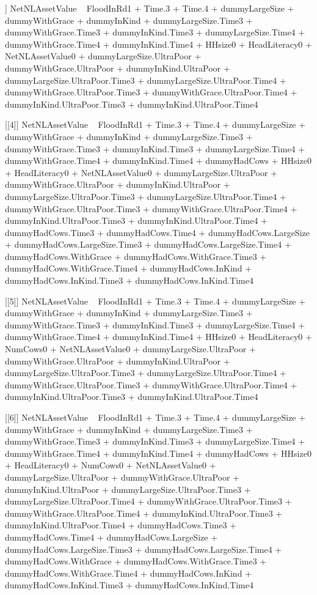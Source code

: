 \begin{Schunk}
\begin{Soutput}
[[3]]
NetNLAssetValue ~ FloodInRd1 + Time.3 + Time.4 + dummyLargeSize + 
    dummyWithGrace + dummyInKind + dummyLargeSize.Time3 + dummyWithGrace.Time3 + 
    dummyInKind.Time3 + dummyLargeSize.Time4 + dummyWithGrace.Time4 + 
    dummyInKind.Time4 + HHsize0 + HeadLiteracy0 + NetNLAssetValue0 + 
    dummyLargeSize.UltraPoor + dummyWithGrace.UltraPoor + dummyInKind.UltraPoor + 
    dummyLargeSize.UltraPoor.Time3 + dummyLargeSize.UltraPoor.Time4 + 
    dummyWithGrace.UltraPoor.Time3 + dummyWithGrace.UltraPoor.Time4 + 
    dummyInKind.UltraPoor.Time3 + dummyInKind.UltraPoor.Time4

[[4]]
NetNLAssetValue ~ FloodInRd1 + Time.3 + Time.4 + dummyLargeSize + 
    dummyWithGrace + dummyInKind + dummyLargeSize.Time3 + dummyWithGrace.Time3 + 
    dummyInKind.Time3 + dummyLargeSize.Time4 + dummyWithGrace.Time4 + 
    dummyInKind.Time4 + dummyHadCows + HHsize0 + HeadLiteracy0 + 
    NetNLAssetValue0 + dummyLargeSize.UltraPoor + dummyWithGrace.UltraPoor + 
    dummyInKind.UltraPoor + dummyLargeSize.UltraPoor.Time3 + 
    dummyLargeSize.UltraPoor.Time4 + dummyWithGrace.UltraPoor.Time3 + 
    dummyWithGrace.UltraPoor.Time4 + dummyInKind.UltraPoor.Time3 + 
    dummyInKind.UltraPoor.Time4 + dummyHadCows.Time3 + dummyHadCows.Time4 + 
    dummyHadCows.LargeSize + dummyHadCows.LargeSize.Time3 + dummyHadCows.LargeSize.Time4 + 
    dummyHadCows.WithGrace + dummyHadCows.WithGrace.Time3 + dummyHadCows.WithGrace.Time4 + 
    dummyHadCows.InKind + dummyHadCows.InKind.Time3 + dummyHadCows.InKind.Time4

[[5]]
NetNLAssetValue ~ FloodInRd1 + Time.3 + Time.4 + dummyLargeSize + 
    dummyWithGrace + dummyInKind + dummyLargeSize.Time3 + dummyWithGrace.Time3 + 
    dummyInKind.Time3 + dummyLargeSize.Time4 + dummyWithGrace.Time4 + 
    dummyInKind.Time4 + HHsize0 + HeadLiteracy0 + NumCows0 + 
    NetNLAssetValue0 + dummyLargeSize.UltraPoor + dummyWithGrace.UltraPoor + 
    dummyInKind.UltraPoor + dummyLargeSize.UltraPoor.Time3 + 
    dummyLargeSize.UltraPoor.Time4 + dummyWithGrace.UltraPoor.Time3 + 
    dummyWithGrace.UltraPoor.Time4 + dummyInKind.UltraPoor.Time3 + 
    dummyInKind.UltraPoor.Time4

[[6]]
NetNLAssetValue ~ FloodInRd1 + Time.3 + Time.4 + dummyLargeSize + 
    dummyWithGrace + dummyInKind + dummyLargeSize.Time3 + dummyWithGrace.Time3 + 
    dummyInKind.Time3 + dummyLargeSize.Time4 + dummyWithGrace.Time4 + 
    dummyInKind.Time4 + dummyHadCows + HHsize0 + HeadLiteracy0 + 
    NumCows0 + NetNLAssetValue0 + dummyLargeSize.UltraPoor + 
    dummyWithGrace.UltraPoor + dummyInKind.UltraPoor + dummyLargeSize.UltraPoor.Time3 + 
    dummyLargeSize.UltraPoor.Time4 + dummyWithGrace.UltraPoor.Time3 + 
    dummyWithGrace.UltraPoor.Time4 + dummyInKind.UltraPoor.Time3 + 
    dummyInKind.UltraPoor.Time4 + dummyHadCows.Time3 + dummyHadCows.Time4 + 
    dummyHadCows.LargeSize + dummyHadCows.LargeSize.Time3 + dummyHadCows.LargeSize.Time4 + 
    dummyHadCows.WithGrace + dummyHadCows.WithGrace.Time3 + dummyHadCows.WithGrace.Time4 + 
    dummyHadCows.InKind + dummyHadCows.InKind.Time3 + dummyHadCows.InKind.Time4
\end{Soutput}
\end{Schunk}
